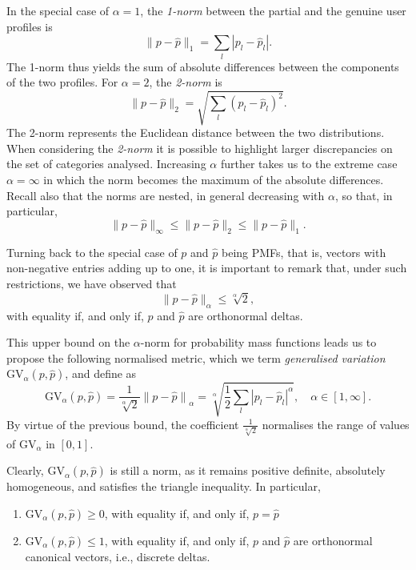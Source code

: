 In the special case of $\alpha = 1$, the \emph{1-norm} between the partial and the genuine user profiles is
$$ \| p - \hat{p} \|_1 = \sum_l{ | p_{l} - \hat{p}_{l} | }.$$
The 1-norm thus yields the sum of absolute differences between the components of the two profiles. 
For $\alpha = 2$, the \emph{2-norm} is
$$ \| p - \hat{p} \|_2 = \sqrt{\sum_l{ {( {p_{l} - \hat{p}_{l}} )}^2 }}.$$
The 2-norm represents the Euclidean distance between the two distributions. When considering the \emph{2-norm} it is possible to highlight larger discrepancies on the set of categories analysed. 
Increasing $\alpha$ further takes us to the extreme case $\alpha=\infty$ in which the norm becomes the maximum of the absolute differences.
Recall also that the norms are nested, in general decreasing with $\alpha$, so that, in particular,
$$ \| p - \hat{p} \|_\infty \leqslant \| p - \hat{p} \|_2 \leqslant \| p - \hat{p} \|_1.$$

Turning back to the special case of $p$ and $\hat{p}$ being PMFs, that is, vectors with non-negative entries adding up to one, it is important to remark that, under such restrictions, we have observed that
$$ \| p - \hat{p} \|_\alpha \leqslant \sqrt[\alpha]{2},$$
with equality if, and only if, $p$ and $\hat{p}$ are orthonormal deltas.

This upper bound on the $\alpha$-norm for probability mass functions leads us to propose the following normalised metric, which we term \emph{generalised variation} $\mathrm{GV}_\alpha(p, \hat{p})$, and define as
$$ \mathrm{GV}_\alpha(p, \hat{p}) = \frac {1} {\sqrt[\alpha]{2}}  {\| p - \hat{p} \|}_\alpha =  \sqrt[\alpha]{{ {\frac {1} {2}} {\sum_l{ | p_{l} - \hat{p}_{l}|^\alpha }} }} ,\quad  \alpha \in [1,\infty].$$
By virtue of the previous bound, the coefficient $\frac {1} {\sqrt[\alpha]{2}}$ normalises the range of values of $\mathrm{GV}_\alpha$ in $[0, 1]$. 

Clearly, $\mathrm{GV}_\alpha(p, \hat{p})$ is still a norm, as it remains positive definite, absolutely homogeneous, and satisfies the triangle inequality. In particular,
\begin{enumerate}
	\item $\mathrm{GV}_\alpha(p,\hat{p})\geqslant 0$, with equality if, and only if, $p=\hat{p}$
	\item $\mathrm{GV}_\alpha(p,\hat{p})\leqslant 1$, with equality if, and only if, $p$ and $\hat{p}$ are orthonormal canonical vectors, i.e., discrete deltas.
\end{enumerate}


